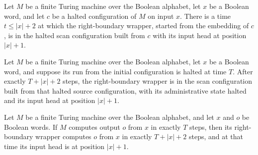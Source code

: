 \begin{lemma}
\label{Turing.FinTM.emCall_right_finish}
\leanok
{}
Let $M$ be a finite Turing machine over the Boolean alphabet, let $x$ be a Boolean word,
and let $c$ be a halted configuration of $M$ on input $x$. There is a time $t\le |x|+2$
at which the right-boundary wrapper, started from the embedding of $c$, is in the halted
scan configuration built from $c$ with its input head at position $|x|+1$.
\end{lemma}

\begin{lemma}
\label{Turing.FinTM.emCall_right_endpoint}
\leanok
{}
Let $M$ be a finite Turing machine over the Boolean alphabet, let $x$ be a Boolean word,
and suppose its run from the initial configuration is halted at time $T$. After exactly
$T+|x|+2$ steps, the right-boundary wrapper is in the scan configuration built from that
halted source configuration, with its administrative state halted and its input head at
position $|x|+1$.
\end{lemma}

\begin{lemma}
\label{Turing.FinTM.emCall_right_computes}
\leanok
{}
Let $M$ be a finite Turing machine over the Boolean alphabet, and let $x$ and $o$ be
Boolean words. If $M$ computes output $o$ from $x$ in exactly $T$ steps, then its
right-boundary wrapper computes $o$ from $x$ in exactly $T+|x|+2$ steps, and at that
time its input head is at position $|x|+1$.
\end{lemma}

